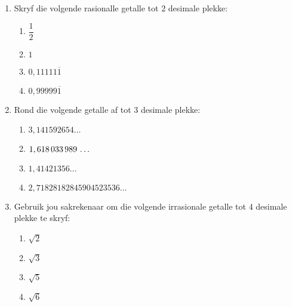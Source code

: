 \begin{eocexercises}{}
\begin{enumerate}[itemsep=5pt, label=\textbf{\arabic*}. ]


\item Skryf die volgende rasionalle getalle tot $2$ desimale plekke:
\begin{enumerate}[itemsep=5pt, label=\textbf{(\alph*)} ]  
    \item $\dfrac{1}{2}$
    \item $1$
    \item $0,11111\overline{1}$
    \item $0,99999\overline{1}$
    \end{enumerate}

\item Rond die volgende getalle af tot $3$ desimale plekke:
\begin{multicols}{2}
    \begin{enumerate}[itemsep=5pt, label=\textbf{(\alph*)} ] 
    \item $3,141592654\ldots$
    \item $1,618\phantom{\rule{0.166667em}{0ex}}033\phantom{\rule{0.166667em}{0ex}}989\phantom{\rule{0.166667em}{0ex}}\ldots$
    \item $1,41421356\ldots$
    \item $2,71828182845904523536\ldots$
    \end{enumerate}
\end{multicols}
\item Gebruik jou sakrekenaar om die volgende irrasionale getalle tot $4$ desimale plekke te skryf:
\begin{multicols}{2}
    \begin{enumerate}[itemsep=5pt, label=\textbf{(\alph*)} ] 
    \item $\sqrt{2}$
    \item $\sqrt{3}$
    \item $\sqrt{5}$
    \item $\sqrt{6}$
    \end{enumerate}
\end{multicols}


\end{enumerate}
\end{eocexercises}
